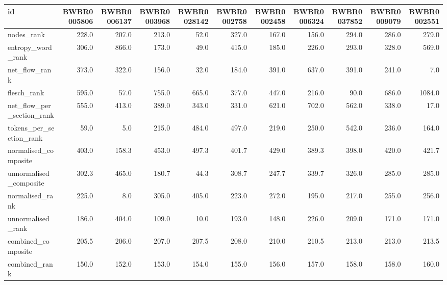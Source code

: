 \begin{tabular}{lrrrrrrrrrr}
\toprule
id & BWBR0005806 & BWBR0006137 & BWBR0003968 & BWBR0028142 & BWBR0002758 & BWBR0002458 & BWBR0006324 & BWBR0037852 & BWBR0009079 & BWBR0002551 \\
\midrule
nodes\_rank & 228.0 & 207.0 & 213.0 & 52.0 & 327.0 & 167.0 & 156.0 & 294.0 & 286.0 & 279.0 \\
\cline{1-11}
entropy\_word\_rank & 306.0 & 866.0 & 173.0 & 49.0 & 415.0 & 185.0 & 226.0 & 293.0 & 328.0 & 569.0 \\
\cline{1-11}
net\_flow\_rank & 373.0 & 322.0 & 156.0 & 32.0 & 184.0 & 391.0 & 637.0 & 391.0 & 241.0 & 7.0 \\
\cline{1-11}
flesch\_rank & 595.0 & 57.0 & 755.0 & 665.0 & 377.0 & 447.0 & 216.0 & 90.0 & 686.0 & 1084.0 \\
\cline{1-11}
net\_flow\_per\_section\_rank & 555.0 & 413.0 & 389.0 & 343.0 & 331.0 & 621.0 & 702.0 & 562.0 & 338.0 & 17.0 \\
\cline{1-11}
tokens\_per\_section\_rank & 59.0 & 5.0 & 215.0 & 484.0 & 497.0 & 219.0 & 250.0 & 542.0 & 236.0 & 164.0 \\
\cline{1-11}
normalised\_composite & 403.0 & 158.3 & 453.0 & 497.3 & 401.7 & 429.0 & 389.3 & 398.0 & 420.0 & 421.7 \\
\cline{1-11}
unnormalised\_composite & 302.3 & 465.0 & 180.7 & 44.3 & 308.7 & 247.7 & 339.7 & 326.0 & 285.0 & 285.0 \\
\cline{1-11}
normalised\_rank & 225.0 & 8.0 & 305.0 & 405.0 & 223.0 & 272.0 & 195.0 & 217.0 & 255.0 & 256.0 \\
\cline{1-11}
unnormalised\_rank & 186.0 & 404.0 & 109.0 & 10.0 & 193.0 & 148.0 & 226.0 & 209.0 & 171.0 & 171.0 \\
\cline{1-11}
combined\_composite & 205.5 & 206.0 & 207.0 & 207.5 & 208.0 & 210.0 & 210.5 & 213.0 & 213.0 & 213.5 \\
\cline{1-11}
combined\_rank & 150.0 & 152.0 & 153.0 & 154.0 & 155.0 & 156.0 & 157.0 & 158.0 & 158.0 & 160.0 \\
\cline{1-11}
\bottomrule
\end{tabular}
